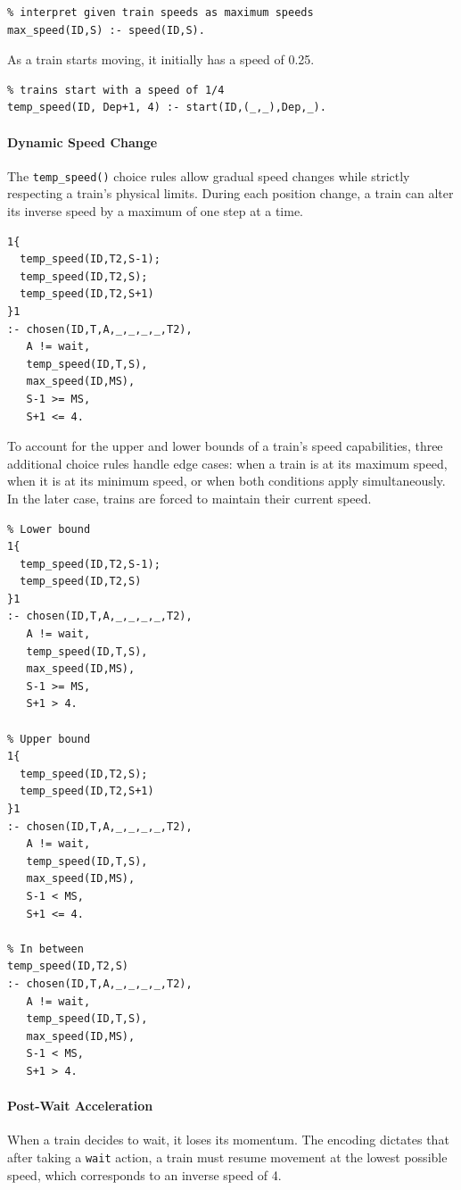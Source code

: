 \documentclass[12pt, a4paper]{llncs}
\begin{document}
\begin{verbatim}
% interpret given train speeds as maximum speeds
max_speed(ID,S) :- speed(ID,S).
\end{verbatim}

As a train starts moving, it initially has a speed of 0.25.

\begin{verbatim}
% trains start with a speed of 1/4 
temp_speed(ID, Dep+1, 4) :- start(ID,(_,_),Dep,_).
\end{verbatim}

\paragraph{Dynamic Speed Change}
The \texttt{temp\_speed()} choice rules allow gradual speed changes while strictly respecting a train's physical limits. During each position change, a train can alter its inverse speed by a maximum of one step at a time.

\begin{verbatim}
1{
  temp_speed(ID,T2,S-1);
  temp_speed(ID,T2,S);
  temp_speed(ID,T2,S+1)
}1
:- chosen(ID,T,A,_,_,_,_,T2),
   A != wait,
   temp_speed(ID,T,S),
   max_speed(ID,MS),
   S-1 >= MS,
   S+1 <= 4.
\end{verbatim}

To account for the upper and lower bounds of a train's speed capabilities, three additional choice rules handle edge cases: when a train is at its maximum speed, when it is at its minimum speed, or when both conditions apply simultaneously. In the later case, trains are forced to maintain their current speed.

\begin{verbatim}
% Lower bound
1{
  temp_speed(ID,T2,S-1);
  temp_speed(ID,T2,S)
}1
:- chosen(ID,T,A,_,_,_,_,T2),
   A != wait,
   temp_speed(ID,T,S),
   max_speed(ID,MS),
   S-1 >= MS,
   S+1 > 4.

% Upper bound
1{
  temp_speed(ID,T2,S);
  temp_speed(ID,T2,S+1)
}1
:- chosen(ID,T,A,_,_,_,_,T2),
   A != wait,
   temp_speed(ID,T,S),
   max_speed(ID,MS),
   S-1 < MS,
   S+1 <= 4.

% In between
temp_speed(ID,T2,S)
:- chosen(ID,T,A,_,_,_,_,T2),
   A != wait,
   temp_speed(ID,T,S),
   max_speed(ID,MS),
   S-1 < MS,
   S+1 > 4.
\end{verbatim}

\paragraph{Post-Wait Acceleration}
When a train decides to wait, it loses its momentum. The encoding dictates that after taking a \texttt{wait} action, a train must resume movement at the lowest possible speed, which corresponds to an inverse speed of 4.
\end{document}
